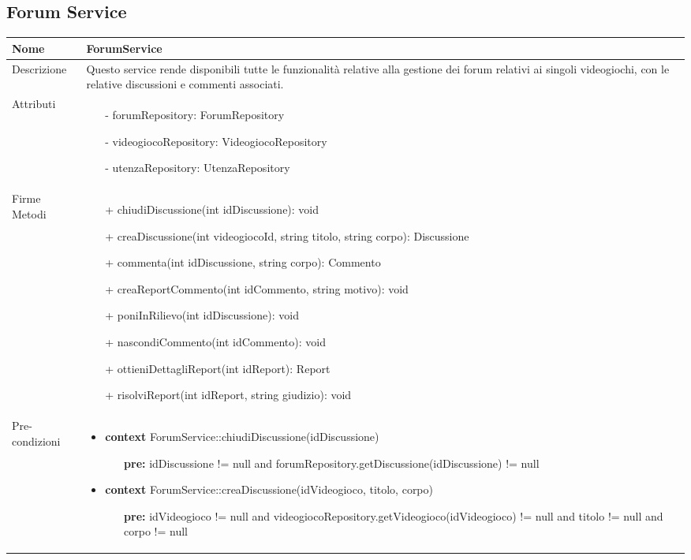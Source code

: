 \subsection{Forum Service}
\small\begin{tabular}{|| l | p{28em} ||} 
	\hline
	Nome & ForumService\\
	\hline
	Descrizione & Questo service rende disponibili tutte le funzionalità relative alla gestione dei forum relativi ai singoli videogiochi, con le relative discussioni e commenti associati. \\
	\hline
	Attributi & \begin{itemize}
		\item[-] forumRepository: ForumRepository
		\item[-] videogiocoRepository: VideogiocoRepository
		\item[-] utenzaRepository: UtenzaRepository
	\end{itemize}\\
	\hline
	Firme Metodi & \begin{itemize}
		\item[+] chiudiDiscussione(int idDiscussione): void
		\item[+] creaDiscussione(int videogiocoId, string titolo, string corpo): Discussione
		\item[+] commenta(int idDiscussione, string corpo): Commento
		\item[+] creaReportCommento(int idCommento, string motivo): void
		\item[+] poniInRilievo(int idDiscussione): void
		\item[+] nascondiCommento(int idCommento): void
		\item[+] ottieniDettagliReport(int idReport): Report
		\item[+] risolviReport(int idReport, string giudizio): void   
	\end{itemize}\\
	\hline
	Pre-condizioni & \begin{itemize}[leftmargin=*]
		\item \textbf{context} ForumService::chiudiDiscussione(idDiscussione)
		\begin{itemize}
			\item[ ] \textbf{pre:} idDiscussione != null and forumRepository.getDiscussione(idDiscussione) != null
		\end{itemize}

		\item \textbf{context} ForumService::creaDiscussione(idVideogioco, titolo, corpo)
		\begin{itemize}
			\item[ ] \textbf{pre:} idVideogioco != null and videogiocoRepository.getVideogioco(idVideogioco) != null and titolo != null and corpo != null
		\end{itemize}


\end{itemize}
\end{tabular}
